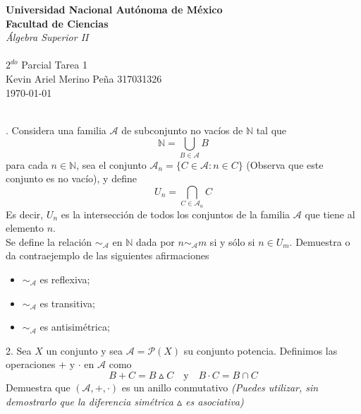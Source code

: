 \documentclass[letterpaper]{article}
\newcommand{\A}{\mathcal{A}}
\newcommand{\ra}{\sim_{\A}}
\newcommand{\N}{\mathds{N}}
\renewcommand{\*}{\cdot}
\theoremstyle{definition}
\begin{document}
		\begin{titlepage}
	\begin{center}
		\textbf{Universidad Nacional Autónoma de México}\\
		\textbf{Facultad de Ciencias} \\
		\textit{Álgebra Superior II} \\[1mm]
		\hrulefill \\
		\large{$ 2^{do} $ Parcial Tarea 1 }\\
		Kevin Ariel Merino Peña  317031326\\
		\today\\
		\hrulefill \\
	\end{center}
	\let\newpage\relax%
	
\end{titlepage}

. Considera una familia $ \A $ de subconjunto no vacíos de $ \N $ tal que \[ \N = \bigcup_{B \in \A} B \] para cada $ n \in \N $, sea el conjunto $ \A_{n}  = \lbrace C \in \A : n\in C \rbrace$ (Observa que este conjunto es no vacío), y define \[ U_n = \bigcap_{C \in \A_n} C \] Es decir, $ U_n $ es la intersección de todos los conjuntos de la familia $ \A $ que tiene al elemento $ n $.\\ Se define la relación $ \ra $ en $ \N $ dada por $ n \ra m $ si y sólo si $ n \in U_m $. Demuestra o da contraejemplo de las siguientes afirmaciones
\begin{itemize}
	\item$ \ra $ es reflexiva;
	\item$ \ra $ es transitiva;
	\item$ \ra $ es antisimétrica;
\end{itemize}

2. Sea $ X $ un conjunto y sea $ \mathcal{A} = \mathcal{P}(X) $ su conjunto potencia. Definimos las operaciones $ + $ y $ \* $ en $ \mathcal{A} $ como 
\[ B + C = B \vartriangle C \quad \text{y} \quad B \* C = B \cap C \]
Demuestra que $ (\mathcal{A}, +, \*) $ es un anillo conmutativo
\textit{(Puedes utilizar, sin demostrarlo que la diferencia simétrica $ \vartriangle $ es asociativa)}
\end{document}

